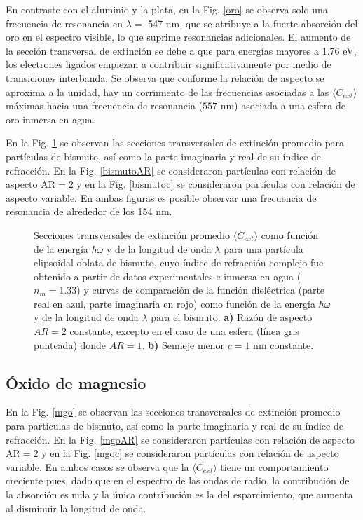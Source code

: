 En contraste con el aluminio y la plata, en la Fig. \ref{oro} se observa solo una frecuencia de resonancia en $\lambda=$ 547 nm, que se atribuye a la fuerte absorción del oro en el espectro visible, lo que suprime resonancias adicionales. El aumento de la sección transversal de extinción se debe a que para energías mayores a 1.76 eV, los electrones ligados empiezan a contribuir significativamente por medio de transiciones interbanda. Se observa que conforme la relación de aspecto se aproxima a la unidad, hay un corrimiento de las frecuencias asociadas a las $\langle C_{ext}\rangle$ máximas hacia una frecuencia de resonancia ($557\text{ nm}$) asociada a una esfera de oro inmersa en agua. 



En la Fig. \ref{bismuto} se observan las secciones transversales de extinción promedio para partículas de bismuto, así como la parte imaginaria y real de su índice de refracción. En la Fig. \ref{bismutoAR} se consideraron partículas con relación de aspecto AR$=2$  y en la Fig. \ref{bismutoc} se consideraron partículas con relación de aspecto variable. En ambas figuras es posible observar una frecuencia de resonancia de alrededor de los 154 nm.

\begin{figure}[H]
	\quad%
	\caption{Secciones transversales de extinción promedio $\langle C_{ext}\rangle$ como función de la energía $\hbar\omega$ y de la longitud de onda $\lambda$ para una partícula elipsoidal oblata de bismuto, cuyo índice de refracción complejo fue obtenido a partir de datos experimentales  e inmersa en agua ($n_m=1.33$) y curvas de comparación de la función dieléctrica (parte real en azul, parte imaginaria en rojo) como función de la energía $\hbar\omega$ y de la longitud de onda $\lambda$ para el bismuto. \textbf{a)} Razón de aspecto $AR=2$ constante, excepto en el caso de una esfera (línea gris punteada) donde $AR=1$. \textbf{b)} Semieje menor $c=1$ nm constante.}\label{bismuto}
\end{figure}


\subsection*{Óxido de magnesio}
En la Fig. \ref{mgo} se observan las secciones transversales de extinción promedio para partículas de bismuto, así como la parte imaginaria y real de su índice de refracción. En la Fig. \ref{mgoAR} se consideraron partículas con relación de aspecto AR$=2$  y en la Fig. \ref{mgoc} se consideraron partículas con relación de aspecto variable. En ambos casos se observa que la $\langle C_{ext}\rangle$ tiene un comportamiento creciente pues, dado que en el espectro de las ondas de radio, la contribución de la absorción es nula y la única contribución es la del esparcimiento, que aumenta al disminuir la longitud de onda.

